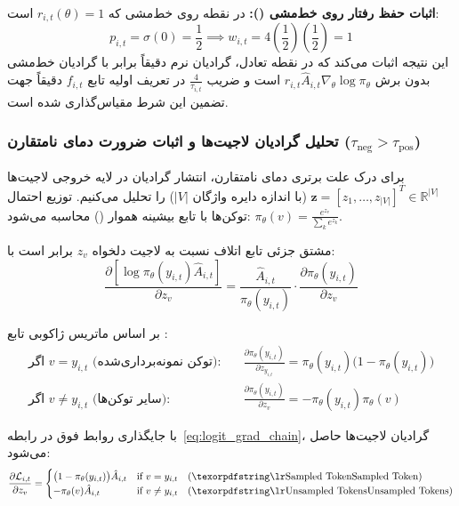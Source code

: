 \textbf{اثبات حفظ رفتار روی خط‌مشی ():}
در نقطه روی خط‌مشی که $r_{i,t}(\theta) = 1$ است:
\begin{equation}
	p_{i,t} = \sigma(0) = \frac{1}{2} \implies w_{i,t} = 4 \left(\frac{1}{2}\right)\left(\frac{1}{2}\right) = 1
\end{equation}
این نتیجه اثبات می‌کند که در نقطه تعادل، گرادیان نرم  دقیقاً برابر با گرادیان خط‌مشی بدون برش $r_{i,t}\hat{A}_{i,t}\nabla_\theta \log \pi_\theta$ است و ضریب $\frac{4}{\tau_{i,t}}$ در تعریف اولیه تابع $f_{i,t}$ دقیقاً جهت تضمین این شرط مقیاس‌گذاری شده است.

\subsubsection*{تحلیل گرادیان لاجیت‌ها و اثبات ضرورت دمای نامتقارن ($\tau_{\text{neg}} > \tau_{\text{pos}}$)}

برای درک علت برتری دمای نامتقارن، انتشار گرادیان در لایه خروجی لاجیت‌ها $\mathbf{z} = [z_1, \dots, z_{|V|}]^T \in \mathbb{R}^{|V|}$ (با اندازه دایره واژگان $|V|$) را تحلیل می‌کنیم. توزیع احتمال توکن‌ها با تابع بیشینه هموار () محاسبه می‌شود: $\pi_\theta(v) = \frac{e^{z_v}}{\sum_{k} e^{z_k}}$.

مشتق جزئی تابع اتلاف نسبت به لاجیت دلخواه $z_v$ برابر است با:
\begin{equation}
	\label{eq:logit_grad_chain}
	\frac{\partial \left[ \log \pi_\theta(y_{i,t}) \hat{A}_{i,t} \right]}{\partial z_v} = \frac{\hat{A}_{i,t}}{\pi_\theta(y_{i,t})} \cdot \frac{\partial \pi_\theta(y_{i,t})}{\partial z_v}
\end{equation}

بر اساس ماتریس ژاکوبی تابع :
\begin{align}
	\text{اگر } v = y_{i,t} \text{ (توکن نمونه‌برداری‌شده):} \quad &\frac{\partial \pi_\theta(y_{i,t})}{\partial z_{y_{i,t}}} = \pi_\theta(y_{i,t})\big(1 - \pi_\theta(y_{i,t})\big) \label{eq:jacob_sampled} \\
	\text{اگر } v \neq y_{i,t} \text{ (سایر توکن‌ها):} \quad &\frac{\partial \pi_\theta(y_{i,t})}{\partial z_v} = -\pi_\theta(y_{i,t}) \pi_\theta(v) \label{eq:jacob_unsampled}
\end{align}

با جایگذاری روابط فوق در رابطه~\eqref{eq:logit_grad_chain}، گرادیان لاجیت‌ها حاصل می‌شود:
\begin{equation}
	\label{eq:logit_gradient_cases}
	\frac{\partial \mathcal{L}_{i,t}}{\partial z_v} = \begin{cases} 
		\big(1 - \pi_\theta(y_{i,t})\big) \hat{A}_{i,t} & \text{if } v = y_{i,t} \quad (\text{\en{Sampled Token}}) \\ 
		-\pi_\theta(v) \hat{A}_{i,t} & \text{if } v \neq y_{i,t} \quad (\text{\en{Unsampled Tokens}}) 
	\end{cases}
\end{equation}

